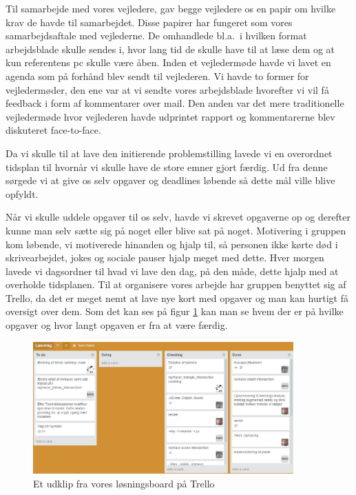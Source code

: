 \documentclass[oneside,a4paper,titlepage]{article}
\begin{document}
Til samarbejde med vores vejledere, gav begge vejledere os en papir om hvilke krav de havde til samarbejdet. Disse papirer har fungeret som vores samarbejdsaftale med vejlederne. De omhandlede bl.a.\ i hvilken format arbejdsblade skulle sendes i, hvor lang tid de skulle have til at læse dem og at kun referentens pc skulle være åben. Inden et vejledermøde havde vi lavet en agenda som på forhånd blev sendt til vejlederen. Vi havde to former for vejledermøder, den ene var at vi sendte vores arbejdsblade hvorefter vi vil få feedback i form af kommentarer over mail. Den anden var det mere traditionelle vejledermøde hvor vejlederen havde udprintet rapport og kommentarerne blev diskuteret face-to-face. 

Da vi skulle til at lave den initierende problemstilling lavede vi en overordnet tidsplan til hvornår vi skulle have de store emner gjort færdig. Ud fra denne sørgede vi at give os selv opgaver og deadlines løbende så dette mål ville blive opfyldt. 

Når vi skulle uddele opgaver til os selv, havde vi skrevet opgaverne op og derefter kunne man selv sætte sig på noget eller blive sat på noget. Motivering i gruppen kom løbende, vi motiverede hinanden og hjalp til, så personen ikke kørte død i skrivearbejdet, jokes og sociale pauser hjalp meget med dette. Hver morgen lavede vi dagsordner til hvad vi lave den dag, på den måde, dette hjalp med at overholde tidsplanen. Til at organisere vores arbejde har gruppen benyttet sig af Trello, da det er meget nemt at lave nye kort med opgaver og man kan hurtigt få oversigt over dem. Som det kan ses på figur \ref{fig:trello} kan man se hvem der er på hvilke opgaver og hvor langt opgaven er fra at være færdig.

\begin{figure}[H]
    \centering
    \includegraphics[width=10cm]{../graphics/trello}
    \caption{Et udklip fra vores løsningsboard på Trello}
    \label{fig:trello}
\end{figure} 
\end{document}
